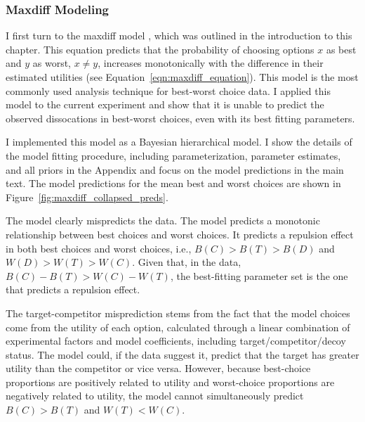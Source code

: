 \subsubsection{Maxdiff Modeling}

I first turn to the maxdiff model \parencite{marleyProbabilisticModelsBest2005}, which was outlined in the introduction to this chapter. This equation predicts that the probability of choosing options $x$ as best and $y$ as worst, $x \neq y$, increases monotonically with the difference in their estimated utilities (see Equation~\ref{eqn:maxdiff_equation}). This model is the most commonly used analysis technique for best-worst choice data. I applied this model to the current experiment and show that it is unable to predict the observed dissocations in best-worst choices, even with its best fitting parameters.

I implemented this model as a Bayesian hierarchical model. I show the details of the model fitting procedure, including parameterization, parameter estimates, and all priors in the Appendix and focus on the model predictions in the main text. The model predictions for the mean best and worst choices are shown in Figure~\ref{fig:maxdiff_collapsed_preds}.

The model clearly mispredicts the data. The model predicts a monotonic relationship between best choices and worst choices. It predicts a repulsion effect in both best choices and worst choices, i.e., $B(C)>B(T)>B(D)$ and $W(D)>W(T)>W(C)$. Given that, in the data, $B(C)-B(T)>W(C)-W(T)$, the best-fitting parameter set is the one that predicts a repulsion effect. 

The target-competitor misprediction stems from the fact that the model choices come from the utility of each option, calculated through a linear combination of experimental factors and model coefficients, including target/competitor/decoy status. The model could, if the data suggest it, predict that the target has greater utility than the competitor or vice versa. However, because best-choice proportions are positively related to utility and worst-choice proportions are negatively related to utility, the model cannot simultaneously predict $B(C)>B(T)$ and $W(T)<W(C)$. 

